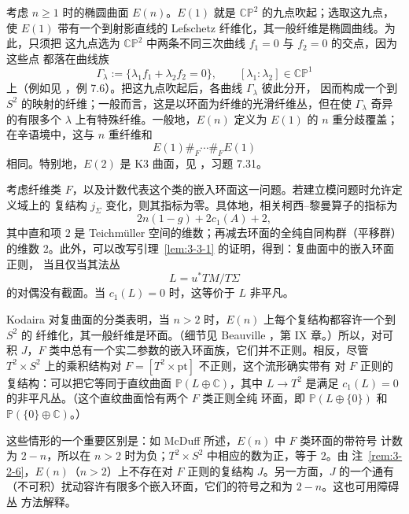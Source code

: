 \begin{example}\label{ex:3-3-7}
考虑 $n\ge1$ 时的椭圆曲面 $E(n)$。$E(1)$ 就是 $\mathbb{CP}^2$ 的九点吹起；选取这九点，
使 $E(1)$ 带有一个到射影直线的 Lefschetz 纤维化，其一般纤维是椭圆曲线。为此，只须把
这九点选为 $\mathbb{CP}^2$ 中两条不同三次曲线 $f_1=0$ 与 $f_2=0$ 的交点，因为这些点
都落在曲线族
\[
  \Gamma_\lambda
  :=\{\lambda_1f_1+\lambda_2f_2=0\},
  \qquad
  [\lambda_1:\lambda_2]\in\mathbb{CP}^1
\]
上（例如见 ，例 7.6）。把这九点吹起后，各曲线 $\Gamma_\lambda$ 彼此分开，
因而构成一个到 $S^2$ 的映射的纤维；一般而言，这是以环面为纤维的光滑纤维丛，但在使
$\Gamma_\lambda$ 奇异的有限多个 $\lambda$ 上有特殊纤维。一般地，$E(n)$ 定义为
$E(1)$ 的 $n$ 重分歧覆盖；在辛语境中，这与 $n$ 重纤维和
\[
  E(1)\mathbin{\#_F}\cdots\mathbin{\#_F}E(1)
\]
相同。特别地，$E(2)$ 是 K3 曲面，见 ，习题 7.31。

考虑纤维类 $F$，以及计数代表这个类的嵌入环面这一问题。若建立模问题时允许定义域上的
复结构 $j_\Sigma$ 变化，则其指标为零。具体地，相关柯西--黎曼算子的指标为
\[
  2n(1-g)+2c_1(A)+2,
\]
其中直和项 $2$ 是 Teichmüller 空间的维数；再减去环面的全纯自同构群（平移群）的维数
$2$。此外，可以改写引理~\ref{lem:3-3-1} 的证明，得到：复曲面中的嵌入环面正则，
当且仅当其法丛
\[
  L=u^*TM/T\Sigma
\]
的对偶没有截面。当 $c_1(L)=0$ 时，这等价于 $L$ 非平凡。

Kodaira 对复曲面的分类表明，当 $n>2$ 时，$E(n)$ 上每个复结构都容许一个到 $S^2$ 的
纤维化，其一般纤维是环面。（细节见 Beauville ，第 IX 章。）所以，对可积
$J$，$F$ 类中总有一个实二参数的嵌入环面族，它们并不正则。相反，尽管
$T^2\times S^2$ 上的乘积结构对 $F=[T^2\times\mathrm{pt}]$ 不正则，这个流形确实带有
对 $F$ 正则的复结构：可以把它等同于直纹曲面 $\mathbb P(L\oplus\mathbb C)$，其中
$L\to T^2$ 是满足 $c_1(L)=0$ 的非平凡丛。（这个直纹曲面恰有两个 $F$ 类正则全纯
环面，即 $\mathbb P(L\oplus\{0\})$ 和 $\mathbb P(\{0\}\oplus\mathbb C)$。）

这些情形的一个重要区别是：如 McDuff  所述，$E(n)$ 中 $F$ 类环面的带符号
计数为 $2-n$，所以在 $n>2$ 时为负；$T^2\times S^2$ 中相应的数为正，等于 $2$。由
注~\ref{rem:3-2-6}，$E(n)$（$n>2$）上不存在对 $F$ 正则的复结构 $J$。另一方面，$J$
的一个通有（不可积）扰动容许有限多个嵌入环面，它们的符号之和为 $2-n$。这也可用障碍丛
方法解释。
\end{example}
